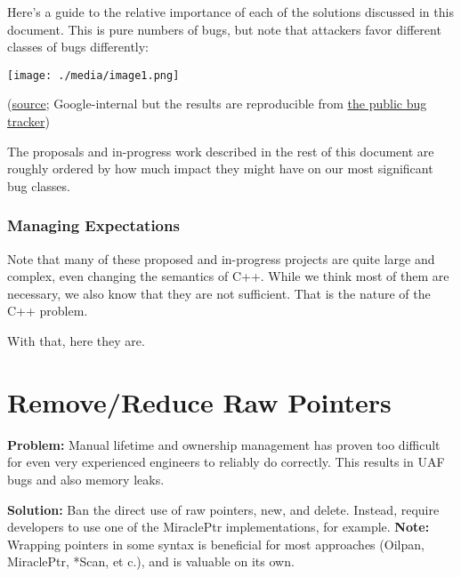 \documentclass[a4paper,12pt,notitlepage,twoside,openright]{article}
\begin{document}
Here's a guide to the relative importance of each of the solutions
discussed in this document. This is pure numbers of bugs, but note that
attackers favor different classes of bugs differently:

\texttt{[image: ./media/image1.png]}

(\href{https://www.google.com/url?q=https://docs.google.com/presentation/d/1UVSc_0CHCdj0iv0c23uJZ6OQ_fr9TrISrYmcahJAbIo/edit?ts\%3D5f31d4f7\%23slide\%3Did.g8f91eb8516_0_2\&sa=D\&source=editors\&ust=1631944129027000\&usg=AOvVaw1rTE-lCvOGTOz6siXuLmUe}{source};
Google-internal but the results are reproducible
from \href{https://www.google.com/url?q=https://bugs.chromium.org/p/chromium/issues/list?colspec\%3DID\%2520Pri\%2520M\%2520Stars\%2520ReleaseBlock\%2520Component\%2520Status\%2520Owner\%2520Summary\%2520OS\%2520Modified\%26x\%3Dm\%26y\%3Dreleaseblock\%26cells\%3Dids\%26q\%3DType\%253DBug-Security\%26can\%3D1\%26sort\%3Dpri\&sa=D\&source=editors\&ust=1631944129027000\&usg=AOvVaw2ewSLXG4Wr_Cfq5rqyOSds}{the
public bug tracker})

The proposals and in-progress work described in the rest of this
document are roughly ordered by how much impact they might have on our
most significant bug classes.

\subsubsection{Managing Expectations}

Note that many of these proposed and in-progress projects are quite
large and complex, even changing the semantics of C++. While we think
most of them are necessary, we also know that they are not sufficient.
That is the nature of the C++ problem.

With that, here they are.

\section{Remove/Reduce Raw Pointers}

\textbf{Problem:} Manual lifetime and ownership management has proven
too difficult for even very experienced engineers to reliably do
correctly. This results in UAF bugs and also memory leaks.

\textbf{Solution:} Ban the direct use of raw pointers, new, and delete.
Instead, require developers to use one of the MiraclePtr
implementations, for example. \textbf{Note:} Wrapping pointers in some
syntax is beneficial for most approaches (Oilpan, MiraclePtr, *Scan, et
c.), and is valuable on its own.
\end{document}
